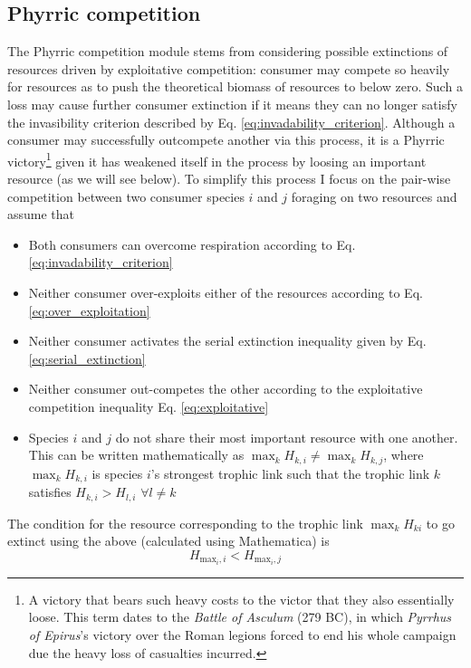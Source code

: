 \documentclass[a4paper]{report}
\DeclareMathOperator{\max}{max}
\begin{document}
\subsection{Phyrric competition}
\label{sec:phy_comp}
The Phyrric competition module stems from  considering possible extinctions of resources driven by exploitative competition: consumer may compete so heavily for resources as to push the theoretical biomass of resources to below zero. Such a loss may cause further consumer extinction if it means they can no longer satisfy the invasibility criterion described by Eq. \eqref{eq:invadability_criterion}. Although a consumer may successfully outcompete another via this process, it is a Phyrric victory\footnote{A victory that bears such heavy costs to the victor that they also essentially loose. This term  dates to the \textit{Battle of Asculum} (279 BC), in which \textit{Pyrrhus of Epirus}'s victory over the Roman legions forced  to end his whole campaign due the heavy loss of casualties incurred.} given it has weakened itself in the process by loosing an important resource (as we will see below). To simplify this process I focus on the pair-wise competition between two consumer species $i$ and $j$ foraging on two resources and assume that
\begin{itemize}
\item Both consumers can overcome respiration according to Eq. \eqref{eq:invadability_criterion}
\item Neither consumer over-exploits either of the resources according to Eq. \eqref{eq:over_exploitation}
\item Neither consumer activates the serial extinction inequality given by Eq. \eqref{eq:serial_extinction}
\item Neither consumer out-competes the other according to the exploitative competition inequality Eq. \eqref{eq:exploitative}
\item Species $i$ and $j$ do not share their most important resource with one another. This can be written mathematically as $\max_k H_{k,i}\neq \max_k H_{k,j}$, where $\max_k H_{k,i}$ is species $i$'s strongest trophic link such that the trophic link $k$ satisfies $H_{k,i} > H_{l,i}$  $\forall l \neq k$
\end{itemize}
The condition for the resource corresponding to the trophic link $\max_k H_{ki}$ to go extinct using the above (calculated using Mathematica) is
\begin{equation}
H_{\text{max}_i,i} < H_{\text{max}_i,j}\label{eq:phyrric_b}
\end{equation}
\end{document}
